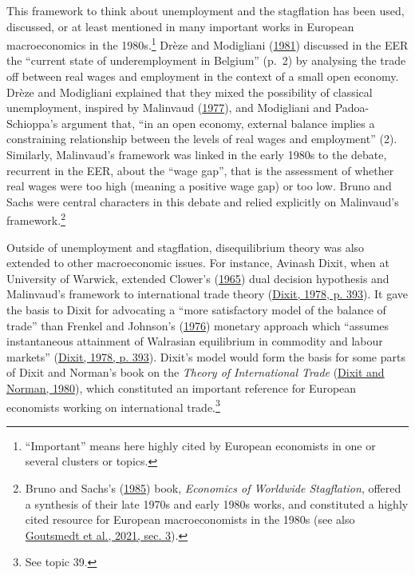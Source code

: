 \documentclass[
  12pt,
  onecolumn]{article}
\begin{document}
This framework to think about unemployment and the stagflation has been
used, discussed, or at least mentioned in many important works in
European macroeconomics in the 1980s.\footnote{``Important'' means here
  highly cited by European economists in one or several clusters or
  topics.} Drèze and Modigliani
(\protect\hyperlink{ref-dreze1981}{1981}) discussed in the EER the
``current state of underemployment in Belgium'' (p.~2) by analysing the
trade off between real wages and employment in the context of a small
open economy. Drèze and Modigliani explained that they mixed the
possibility of classical unemployment, inspired by Malinvaud
(\protect\hyperlink{ref-malinvaud1977}{1977}), and Modigliani and
Padoa-Schioppa's argument that, ``in an open economy, external balance
implies a constraining relationship between the levels of real wages and
employment'' (2). Similarly, Malinvaud's framework was linked in the
early 1980s to the debate, recurrent in the EER, about the ``wage gap'',
that is the assessment of whether real wages were too high (meaning a
positive wage gap) or too low. Bruno and Sachs were central characters
in this debate and relied explicitly on Malinvaud's
framework.\footnote{Bruno and Sachs's
  (\protect\hyperlink{ref-brunosachs1985}{1985}) book, \emph{Economics
  of Worldwide Stagflation}, offered a synthesis of their late 1970s and
  early 1980s works, and constituted a highly cited resource for
  European macroeconomists in the 1980s (see also
  \protect\hyperlink{ref-goutsmedt2021}{Goutsmedt et al., 2021, sec.
  3}).}

Outside of unemployment and stagflation, disequilibrium theory was also
extended to other macroeconomic issues. For instance, Avinash Dixit,
when at University of Warwick, extended Clower's
(\protect\hyperlink{ref-clower1965}{1965}) dual decision hypothesis and
Malinvaud's framework to international trade theory
(\protect\hyperlink{ref-dixit1978}{Dixit, 1978, p. 393}). It gave the
basis to Dixit for advocating a ``more satisfactory model of the balance
of trade'' than Frenkel and Johnson's
(\protect\hyperlink{ref-frenkel1976}{1976}) monetary approach which
``assumes instantaneous attainment of Walrasian equilibrium in commodity
and labour markets'' (\protect\hyperlink{ref-dixit1978}{Dixit, 1978, p.
393}). Dixit's model would form the basis for some parts of Dixit and
Norman's book on the \emph{Theory of International Trade}
(\protect\hyperlink{ref-dixit1980}{Dixit and Norman, 1980}), which
constituted an important reference for European economists working on
international trade.\footnote{See topic 39.}
\end{document}
